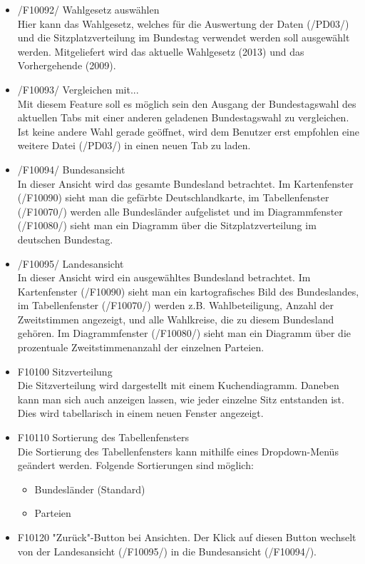 \documentclass[10pt,a4paper]{article}
\begin{document}
\begin{itemize}
	\item /F10092/ Wahlgesetz auswählen \hfill \\
	Hier kann das Wahlgesetz, welches für die Auswertung der Daten (/PD03/) und die Sitzplatzverteilung im Bundestag verwendet werden soll ausgewählt werden. Mitgeliefert wird das aktuelle Wahlgesetz (2013) und das Vorhergehende (2009).
	\item /F10093/ Vergleichen mit... \hfill \\
	Mit diesem Feature soll es möglich sein den Ausgang der Bundestagswahl des aktuellen Tabs mit einer anderen geladenen Bundestagswahl zu vergleichen. Ist keine andere Wahl gerade geöffnet, wird dem Benutzer erst empfohlen eine weitere Datei (/PD03/) in einen neuen Tab zu laden.
	\item /F10094/ Bundesansicht \hfill \\
	In dieser Ansicht wird das gesamte Bundesland betrachtet. Im Kartenfenster (/F10090) sieht man die gefärbte Deutschlandkarte, im Tabellenfenster (/F10070/) werden alle Bundesländer aufgelistet und im Diagrammfenster (/F10080/) sieht man ein Diagramm über die Sitzplatzverteilung im deutschen Bundestag.
	\item /F10095/ Landesansicht \hfill \\
	In dieser Ansicht wird ein ausgewähltes Bundesland betrachtet. Im Kartenfenster (/F10090) sieht man ein kartografisches Bild des Bundeslandes, im Tabellenfenster (/F10070/) werden z.B. Wahlbeteiligung, Anzahl der Zweitstimmen angezeigt, und alle Wahlkreise, die zu diesem Bundesland gehören. Im Diagrammfenster (/F10080/) sieht man ein Diagramm über die prozentuale Zweitstimmenanzahl der einzelnen Parteien.
	\item F10100 Sitzverteilung \hfill \\
	Die Sitzverteilung wird dargestellt mit einem Kuchendiagramm. Daneben kann man sich auch anzeigen lassen, wie jeder einzelne Sitz entstanden ist. Dies wird tabellarisch in einem neuen Fenster angezeigt.
	\item F10110 Sortierung des Tabellenfensters \hfill \\
	Die Sortierung des Tabellenfensters kann mithilfe eines Dropdown-Menüs geändert werden. Folgende Sortierungen sind möglich:
	\begin{itemize}
		\item Bundesländer (Standard)
		\item Parteien
	\end{itemize}
	\item F10120 "Zurück"-Button bei Ansichten.
	Der Klick auf diesen Button wechselt von der Landesansicht (/F10095/) in die Bundesansicht (/F10094/).
\end{itemize}
\end{document}
